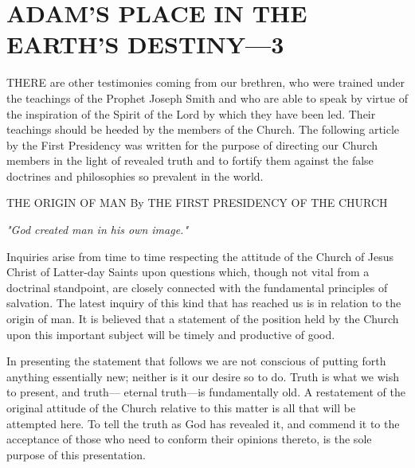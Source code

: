 \chapter{ADAM'S PLACE IN THE EARTH'S DESTINY—3}

THERE are other testimonies coming from our brethren, who were trained under the
teachings of the Prophet Joseph Smith and who are able to speak by virtue of the inspiration
of the Spirit of the Lord by which they have been led. Their teachings should be heeded by
the members of the Church. The following article by the First Presidency was written for the
purpose of directing our Church members in the light of revealed truth and to fortify them
against the false doctrines and philosophies so prevalent in the world.

THE ORIGIN OF MAN By THE FIRST PRESIDENCY OF THE CHURCH

\textit{"God created man in his own image."}

Inquiries arise from time to time respecting the attitude of the Church of Jesus Christ of
Latter-day Saints upon questions which, though not vital from a doctrinal standpoint, are
closely connected with the fundamental principles of salvation. The latest inquiry of this kind
that has reached us is in relation to the origin of man. It is believed that a statement of the
position held by the Church upon this important subject will be timely and productive of
good.

In presenting the statement that follows we are not conscious of putting forth anything
essentially new; neither is it our desire so to do. Truth is what we wish to present, and truth—
eternal truth—is fundamentally old. A restatement of the original attitude of the Church
relative to this matter is all that will be attempted here. To tell the truth as God has revealed
it, and commend it to the acceptance of those who need to conform their opinions thereto, is
the sole purpose of this presentation.

